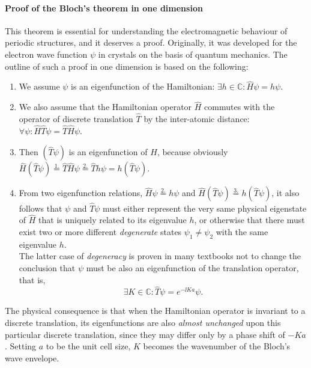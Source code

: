 \paragraph{Proof of the Bloch's theorem in one dimension}%
This theorem is essential for understanding the electromagnetic behaviour of periodic structures, and it deserves a proof. Originally, it was developed for the electron wave function $\psi$ in crystals on the basis of quantum mechanics. The outline of such a proof in one dimension is based on the following:
\label{blochproof}
\begin{enumerate}
 \item{We assume $\psi$ is an eigenfunction of the Hamiltonian: $\exists h\in \mathbb{C}: \hat H\psi = h\psi$.} 
 \item{We also assume that the Hamiltonian operator $\hat H$ commutes with the operator of discrete translation $\hat T$ by the inter-atomic distance: $\forall \psi: \hat H\hat T\psi = \hat T\hat H\psi$. } 
 \item{Then $(\hat T\psi)$ is an eigenfunction of $H$, because obviously $\hat H(\hat T\psi) \stackrel{1.}{=} \hat T\hat H\psi \stackrel{2.}{=} \hat Th\psi = h(\hat T\psi)$. }
 \item{From two eigenfunction relations, $\hat H\psi\stackrel{2.}{=} h\psi$ and $\hat H(\hat T\psi) \stackrel{3.}{=} h(\hat T\psi)$, it also follows that $\psi$ and $\hat T\psi$ must either represent the very same physical eigenstate of $\hat H$ that is uniquely related to its eigenvalue $h$, or otherwise that there must exist two or more different \textit{degenerate} states $\psi_1\neq \psi_2$ with the same eigenvalue $h$.\\ 
 The latter case of \textit{degeneracy} is proven in many textbooks not to change the conclusion that $\psi$ must be also an eigenfunction of the translation operator, that is,
$$\exists K\in \mathbb{C}: \hat T\psi = e^{-\ii Ka}\psi.$$ 
}
\end{enumerate}
 The physical consequence is that when the Hamiltonian operator is invariant to a discrete translation, its eigenfunctions are also \textit{almost unchanged} upon this particular discrete translation, since they may differ only by a phase shift of $-Ka$. Setting $a$ to be the unit cell size, $K$ becomes the wavenumber of the Bloch's wave envelope.
%

